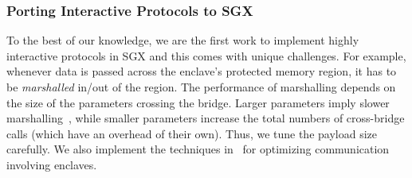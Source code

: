 
\subsubsection{Porting Interactive Protocols to SGX}
To the best of our knowledge, we are the first work to implement highly interactive protocols in SGX and this comes with unique challenges. For example, whenever data is passed across the enclave's protected memory region, it has to be {\em marshalled} in/out of the region.
The performance of marshalling depends on the size of the parameters crossing the bridge. Larger parameters imply slower marshalling~\cite{intelsgxperf}, while smaller parameters increase the total numbers of cross-bridge calls (which have an overhead of their own). 
Thus, we tune the payload size carefully. 
We also implement the techniques in~\cite{sealedglass}  for optimizing communication involving enclaves. 




